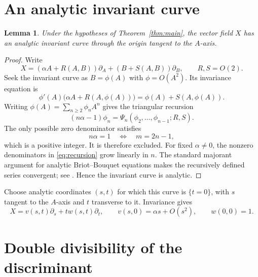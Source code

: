 \documentclass[11pt]{article}
\newtheorem{lemma}[theorem]{Lemma}
\theoremstyle{remark}
\begin{document}
\section{An analytic invariant curve}

\begin{lemma}\label{lem:curve}
Under the hypotheses of Theorem~\ref{thm:main}, the vector field $X$ has
an analytic invariant curve through the origin tangent to the $A$-axis.
\end{lemma}

\begin{proof}
Write
\[
 X=(\alpha A+R(A,B))\partial_A+(B+S(A,B))\partial_B,
 \qquad R,S=O(2).
\]
Seek the invariant curve as $B=\phi(A)$ with $\phi=O(A^2)$.  Its
invariance equation is
\begin{equation}\label{eq:invariance}
 \phi'(A)\bigl(\alpha A+R(A,\phi(A))\bigr)
 =\phi(A)+S(A,\phi(A)).
\end{equation}
Writing $\phi(A)=\sum_{n\ge2}\phi_nA^n$ gives the triangular recursion
\begin{equation}\label{eq:recursion}
 (n\alpha-1)\phi_n
 =\Psi_n(\phi_2,\ldots,\phi_{n-1};R,S).
\end{equation}
The only possible zero denominator satisfies
\[
 n\alpha=1
 \quad\Longleftrightarrow\quad
 m=2n-1,
\]
which is a positive integer.  It is therefore excluded.  For fixed
$\alpha\ne0$, the nonzero denominators in \eqref{eq:recursion} grow
linearly in $n$.  The standard majorant argument for analytic
Briot--Bouquet equations makes the recursively defined series convergent;
see \cite[Chapter~2]{IlyashenkoYakovenko}.  Hence the invariant curve is
analytic.
\end{proof}

Choose analytic coordinates $(s,t)$ for which this curve is $\{t=0\}$,
with $s$ tangent to the $A$-axis and $t$ transverse to it.  Invariance gives
\begin{equation}\label{eq:Xst}
 X=v(s,t)\partial_s+t w(s,t)\partial_t,
 \qquad
 v(s,0)=\alpha s+O(s^2),
 \qquad
 w(0,0)=1.
\end{equation}

\section{Double divisibility of the discriminant}
\end{document}
